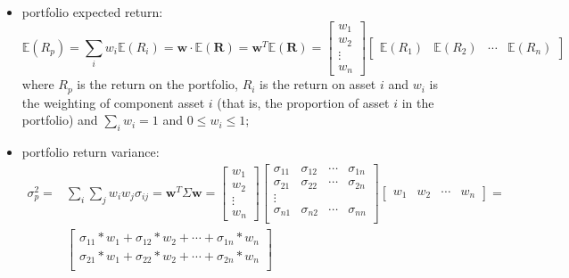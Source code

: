 \begin{itemize}
	\tightlist
	\item
	portfolio expected return: 
	\begin{equation} 
		\mathbb{E}(R_{p}) = \sum _{i}w_{i} \mathbb{E}(R_{i}) = \mathbf{w}\cdot \mathbb{E}(\mathbf{R}) = \mathbf{w}^T \mathbb{E}(\mathbf{R})=
		\begin{bmatrix}
			w_1 \\ 
			w_2 \\ 
			\vdots \\
			w_n
		\end{bmatrix}
		\begin{bmatrix}
			\mathbb{E}(R_1) & \mathbb{E}(R_2) & \cdots & \mathbb{E}(R_n)
		\end{bmatrix}
	\end{equation} 
	where \(R_{p}\) is the return on the portfolio, \(R_{i}\) is the return on asset \(i\) and \(w_{i}\) is the weighting of component asset \(i\) (that is, the proportion of asset \(i\) in the portfolio) and \(\sum_{i}w_i = 1\) and \(0 \le w_i \le 1\);
	\item
	portfolio return variance:
	\begin{equation}
		\begin{aligned}
			\sigma _{p}^{2} = &\sum _{i}\sum _{j}w_{i}w_{j}\sigma _{ij} = \mathbf{w}^T\Sigma\mathbf{w} =
			\begin{bmatrix}
				w_1 \\ 
				w_2 \\ 
				\vdots \\
				w_n
			\end{bmatrix}
			\begin{bmatrix}
				\sigma_{11} & \sigma_{12} & \cdots & \sigma_{1n} \\
				\sigma_{21} & \sigma_{22} & \cdots & \sigma_{2n} \\
				\vdots & & \\
				\sigma_{n1} & \sigma_{n2} & \cdots & \sigma_{nn} \\
			\end{bmatrix}
			\begin{bmatrix}
				w_1 & w_2 & \cdots & w_n
			\end{bmatrix} =\\ 
			&\begin{bmatrix}
				\sigma_{11} *w_1 + \sigma_{12} *w_2 + \cdots + \sigma_{1n}*w_n \\
				\sigma_{21} *w_1 + \sigma_{22} *w_2  +\cdots + \sigma_{2n}*w_n \\

\end{bmatrix}
\end{aligned}
\end{equation}
\end{itemize}
